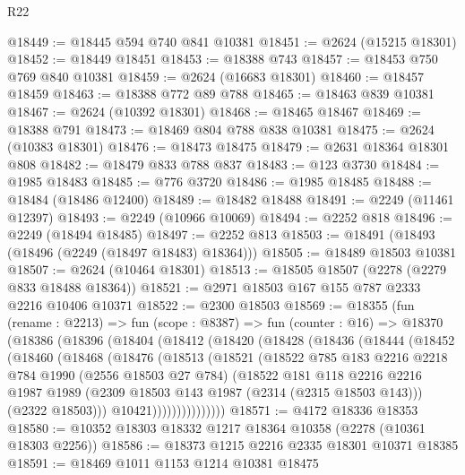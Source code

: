 \begin{lexlean}{R22}
\begin{coremodule}
@18449 := @18445 @594 @740 @841 @10381
@18451 := @2624 (@15215 @18301)
@18452 := @18449 @18451
@18453 := @18388 @743
@18457 := @18453 @750 @769 @840 @10381
@18459 := @2624 (@16683 @18301)
@18460 := @18457 @18459
@18463 := @18388 @772 @89 @788
@18465 := @18463 @839 @10381
@18467 := @2624 (@10392 @18301)
@18468 := @18465 @18467
@18469 := @18388 @791
@18473 := @18469 @804 @788 @838 @10381
@18475 := @2624 (@10383 @18301)
@18476 := @18473 @18475
@18479 := @2631 @18364 @18301 @808
@18482 := @18479 @833 @788 @837
@18483 := @123 @3730
@18484 := @1985 @18483
@18485 := @776 @3720
@18486 := @1985 @18485
@18488 := @18484 (@18486 @12400)
@18489 := @18482 @18488
@18491 := @2249 (@11461 @12397)
@18493 := @2249 (@10966 @10069)
@18494 := @2252 @818
@18496 := @2249 (@18494 @18485)
@18497 := @2252 @813
@18503 := @18491 (@18493 (@18496 (@2249 (@18497 @18483) @18364)))
@18505 := @18489 @18503 @10381
@18507 := @2624 (@10464 @18301)
@18513 := @18505 @18507 (@2278 (@2279 @833 @18488 @18364))
@18521 := @2971 @18503 @167 @155 @787 @2333 @2216 @10406 @10371
@18522 := @2300 @18503
@18569 := @18355
    (fun (rename : @2213) =>
    fun (scope : @8387) =>
    fun (counter : @16) =>
    @18370
      (@18386
        (@18396
          (@18404
            (@18412
              (@18420
                (@18428
                  (@18436
                    (@18444
                      (@18452
                        (@18460
                          (@18468
                            (@18476
                              (@18513
                                (@18521
                                  (@18522
                                    @785
                                    @183
                                    @2216
                                    @2218
                                    @784
                                    @1990
                                    (@2556 @18503 @27 @784)
                                    (@18522
                                      @181
                                      @118
                                      @2216
                                      @2216
                                      @1987
                                      @1989
                                      (@2309 @18503 @143 @1987 (@2314 (@2315 @18503 @143)))
                                      (@2322 @18503)))
                                  @10421)))))))))))))))
@18571 := @4172 @18336 @18353
@18580 := @10352 @18303 @18332 @1217 @18364 @10358 (@2278 (@10361 @18303 @2256))
@18586 := @18373 @1215 @2216 @2335 @18301 @10371 @18385
@18591 := @18469 @1011 @1153 @1214 @10381 @18475

\end{coremodule}
\end{lexlean}
